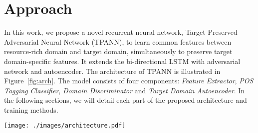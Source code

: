 \documentclass[11pt,letterpaper]{article}
\begin{document}
\section{Approach}


In this work, we propose a novel recurrent neural network, Target Preserved Adversarial Neural Network (TPANN), to  learn common features between resource-rich domain and target domain, simultaneously to preserve target domain-specific features. It extends the bi-directional LSTM with adversarial network and autoencoder. The architecture of TPANN is illustrated in Figure~\ref{fig:arch}. The model consists of four components: \textit{Feature Extractor}, \textit{POS Tagging Classifier}, \textit{Domain Discriminator} and \textit{Target Domain Autoencoder}.  In the following sections, we will detail each part of the proposed architecture and training methods.

\begin{figure*}[t!]
\centering
  \texttt{[image: ./images/architecture.pdf]}
  \caption{The general architecture of the proposed method.}
  \label{fig:arch}
\end{figure*}

\end{document}
